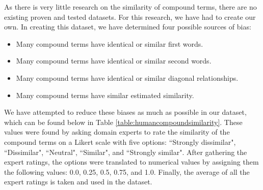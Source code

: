 \documentclass{article}
\begin{document}
As there is very little research on the similarity of compound terms, there are no existing proven and tested datasets. For this research, we have had to create our own. In creating this dataset, we have determined four possible sources of bias:
\begin{itemize}
	\item Many compound terms have identical or similar first words.
	\item Many compound terms have identical or similar second words.
	\item Many compound terms have identical or similar diagonal relationships.
	\item Many compound terms have similar estimated similarity.
\end{itemize}
We have attempted to reduce these biases as much as possible in our dataset, which can be found below in Table \ref{table:humancompoundsimilarity}. These values were found by asking domain experts to rate the similarity of the compound terms on a Likert scale with five options: ``Strongly dissimilar", ``Dissimilar", ``Neutral", ``Similar", and ``Strongly similar". After gathering the expert ratings, the options were translated to numerical values by assigning them the following values: 0.0, 0.25, 0.5, 0.75, and 1.0. Finally, the average of all the expert ratings is taken and used in the dataset.
\end{document}
